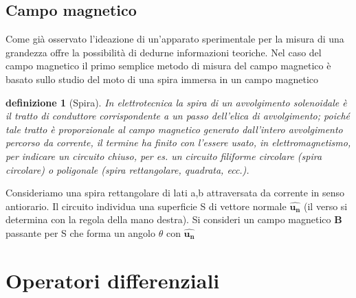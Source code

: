 \documentclass[10pt,a4paper]{article}
\newtheorem{definizione}{definizione}
\begin{document}
\subsection{Campo magnetico}
Come già osservato l'ideazione di un'apparato sperimentale per la misura di una grandezza offre la possibilità di dedurne informazioni teoriche. Nel caso del campo magnetico il primo semplice metodo di misura del campo magnetico è basato sullo studio del moto di una spira immersa in un campo magnetico
\begin{definizione}[Spira]
	 In elettrotecnica la spira di un avvolgimento solenoidale è il tratto di conduttore corrispondente a un passo dell’elica di avvolgimento; poiché tale tratto è proporzionale al campo magnetico generato dall'intero avvolgimento percorso da corrente, il termine ha finito con l’essere usato, in elettromagnetismo, per indicare un circuito chiuso, per es. un circuito filiforme circolare (spira circolare) o poligonale (spira rettangolare, quadrata, ecc.).
\end{definizione}
Consideriamo una spira rettangolare di lati a,b attraversata da corrente in senso antiorario. Il circuito individua una superficie S di vettore normale $\mathbf{\hat{u_n}}$ (il verso si determina con la regola della mano destra). Si consideri un campo magnetico $\mathbf{B}$ passante per S che forma un angolo $\theta$ con $\mathbf{\hat{u_n}}$ 

\appendix
\section{Operatori differenziali}
\end{document}
